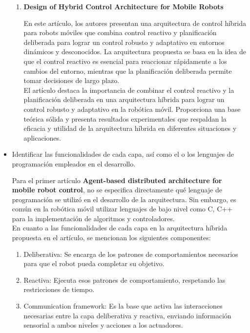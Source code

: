 \documentclass{article}
\begin{document}
\begin{itemize}
\begin{enumerate}
  \item \textbf{Design of Hybrid Control Architecture for Mobile Robots}

    En este artículo, los autores presentan una arquitectura de control híbrida para robots móviles que combina control reactivo y planificación deliberada para lograr un control robusto y adaptativo en entornos dinámicos y desconocidos. La arquitectura propuesta se basa en la idea de que el control reactivo es esencial para reaccionar rápidamente a los cambios del entorno, mientras que la planificación deliberada permite tomar decisiones de largo plazo.\\

    El artículo destaca la importancia de combinar el control reactivo y la planificación deliberada en una arquitectura híbrida para lograr un control robusto y adaptativo en la robótica móvil. Proporciona una base teórica sólida y presenta resultados experimentales que respaldan la eficacia y utilidad de la arquitectura híbrida en diferentes situaciones y aplicaciones.\\

    
    
  \end{enumerate}
    

\item{Identificar las funcionalidades de cada capa, así como el o los lenguajes de programación empleados en el desarrollo.}

  Para el primer artículo \textbf{Agent-based distributed architecture for mobile robot control}, no se especifica directamente qué lenguaje de programación se utilizó en el desarrollo de la arquitectura. Sin embargo, es común en la robótica móvil utilizar lenguajes de bajo nivel como C, C++ para la implementación de algoritmos y controladores.\\

  En cuanto a las funcionalidades de cada capa en la arquitectura híbrida propuesta en el artículo, se mencionan los siguientes componentes:\\

  \begin{enumerate}
  \item Deliberativa: Se encarga de los patrones de comportamientos necesarios para que el robot pueda completar su objetivo.  
  \item Reactiva: Ejecuta esos patrones de comportamiento, respetando las restricciones de tiempo.
  \item Communication framework: Es la base que activa las interacciones necesarias entre la capa deliberativa y reactiva, enviando información sensorial a ambos niveles y acciones a los actuadores.
  \end{enumerate}


\end{itemize}
\end{document}
